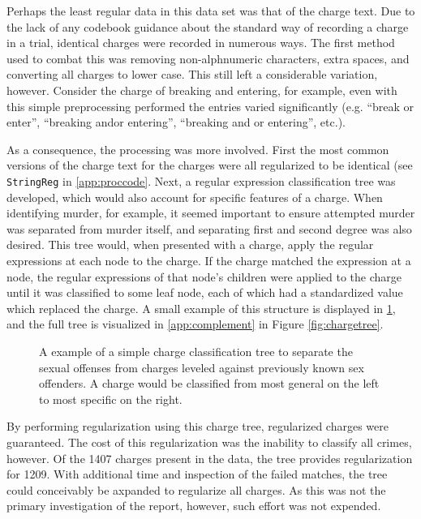 Perhaps the least regular data in this data set was that of the charge text. Due to the lack of any codebook guidance about the
standard way of recording a charge in a trial, identical charges were recorded in numerous ways. The first method used to combat
this was removing non-alphnumeric characters, extra spaces, and converting all charges to lower case. This still left a
considerable variation, however. Consider the charge of breaking and entering, for example, even with this simple preprocessing
performed the entries varied significantly (e.g. ``break or enter'', ``breaking andor entering'', ``breaking and or entering'',
etc.).

As a consequence, the processing was more involved. First the most common versions of the charge text for the charges were all
regularized to be identical (see \texttt{StringReg} in \ref{app:proccode}. Next, a regular expression classification tree was
developed, which would also account for specific features of a charge. When identifying murder, for example, it seemed important
to ensure attempted murder was separated from murder itself, and separating first and second degree was also desired. This tree
would, when presented with a charge, apply the regular expressions at each node to the charge. If the charge matched the
expression at a node, the regular expressions of that node's children were applied to the charge until it was classified to some
leaf node, each of which had a standardized value which replaced the charge. A small example of this structure is displayed in
\ref{fig:exampletree}, and the full tree is visualized in \ref{app:complement} in Figure \ref{fig:chargetree}.

\begin{figure}[!h]
  \centering
  \caption[Simple Charge Tree Example]{A example of a simple charge classification tree to separate the sexual offenses from
    charges leveled against previously known sex offenders. A charge would be classified from most general on the left to most
    specific on the right.}
  \label{fig:exampletree}
\end{figure}

By performing regularization using this charge tree, regularized charges were guaranteed. The cost of this regularization was the
inability to classify all crimes, however. Of the 1407 charges present in the data, the tree provides regularization for
1209. With additional time and inspection of the failed matches, the tree could conceivably be axpanded to regularize all
charges. As this was not the primary investigation of the report, however, such effort was not expended.

